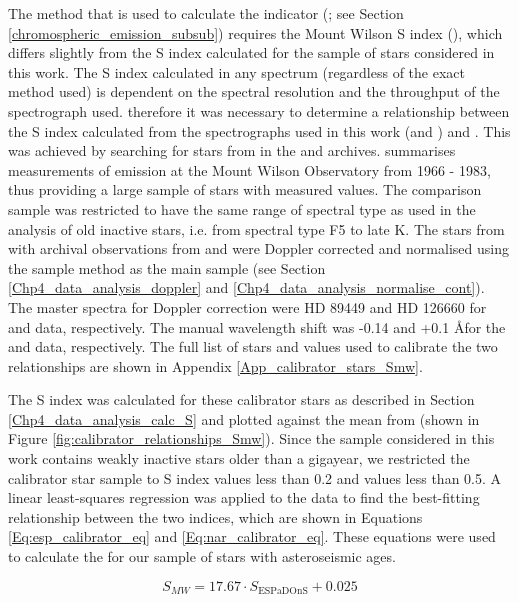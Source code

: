 The method that is used to calculate the \Rprime indicator (\citealt{Noyes_etal_1984}; see Section \ref{chromospheric_emission_subsub}) requires the Mount Wilson S index (\Smw), which differs slightly from the S index calculated for the sample of stars considered in this work. The S index calculated in any spectrum (regardless of the exact method used) is dependent on the spectral resolution and the throughput of the spectrograph used. therefore it was necessary to determine a relationship between the S index calculated from the spectrographs used in this work (\esp and \narval) and \Smw. This was achieved by searching for stars from \citet{Duncan_etal_1991} in the \esp and \narval archives. \citet{Duncan_etal_1991} summarises measurements of \caII emission at the Mount Wilson Observatory from 1966 - 1983, thus providing a large sample of stars with measured \Smw values. The comparison sample was restricted to have the same range of spectral type as used in the analysis of old inactive stars, i.e. from spectral type F5 to late K. The stars from \citet{Duncan_etal_1991} with archival observations from \esp and \narval were Doppler corrected and normalised using the sample method as the main sample (see Section \ref{Chp4_data_analysis_doppler} and \ref{Chp4_data_analysis_normalise_cont}). The master spectra for Doppler correction were HD 89449 and HD 126660 for \esp and \narval data, respectively. The manual wavelength shift was -0.14 and +0.1 \AA \space for the \esp and \narval data, respectively. The full list of stars and values used to calibrate the two relationships are shown in Appendix \ref{App_calibrator_stars_Smw}.



The S index was calculated for these calibrator stars as described in Section \ref{Chp4_data_analysis_calc_S} and plotted against the mean \Smw from \citet{Duncan_etal_1991} (shown in Figure \ref{fig:calibrator_relationships_Smw}). Since the sample considered in this work contains weakly inactive stars older than a gigayear, we restricted the calibrator star sample to S index values less than 0.2 and \Smw values less than 0.5. A linear least-squares regression was applied to the data to find the best-fitting relationship between the two indices, which are shown in Equations \ref{Eq:esp_calibrator_eq} and \ref{Eq:nar_calibrator_eq}. These equations were used to calculate the \Smw for our sample of stars with asteroseismic ages.

\begin{equation}
S_{MW} = 17.67 \cdot S_{\mathrm{ESPaDOnS}}+ 0.025
\label{Eq:esp_calibrator_eq}
\end{equation}

